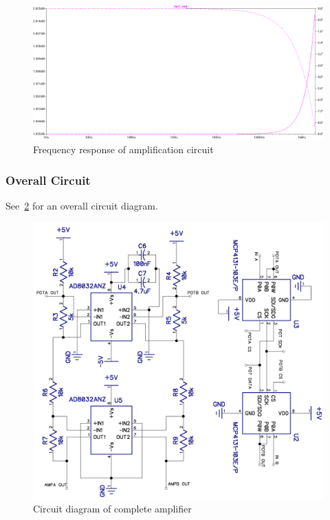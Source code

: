 \begin{landscape}
  \begin{figure}[ht]
    \includegraphics[width=\linewidth]{img/amplifier/frequency_response_inverted.png}
    \caption[Amplification Circuit Bode Plot]{Frequency response of amplification circuit}
    \label{fig:amp_sim:freq_response}
  \end{figure}
\end{landscape}

\subsubsection{Overall Circuit}

See~\cref{fig:ampCircuitDiagram} for an overall circuit diagram.

\begin{figure}[h]
  \includegraphics[width=\textwidth]{img/amplifier/overall.png}
  \caption[Amplifier circuit diagram]{Circuit diagram of complete amplifier}
  \label{fig:ampCircuitDiagram}
\end{figure}


